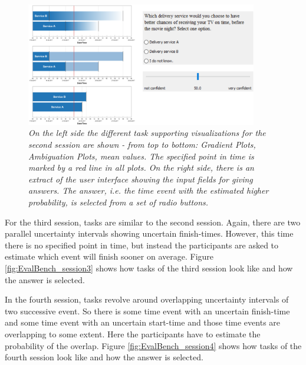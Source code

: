 \begin{figure}[H]
	\centering
	\includegraphics[width=0.9\textwidth]{figures/EvalBench_session2.png}
	\caption{\textit{On the left side the different task supporting visualizations for the second session are shown - from top to bottom: Gradient Plots, Ambiguation Plots, mean values. The specified point in time is marked by a red line in all plots. On the right side, there is an extract of the user interface showing the input fields for giving answers. The answer, i.e. the time event with the estimated higher probability, is selected from a set of radio buttons.}}
	\label{fig:EvalBench_session2}
\end{figure}

For the third session, tasks are similar to the second session. Again, there are two parallel uncertainty intervals showing uncertain finish-times. However, this time there is no specified point in time, but instead the participants are asked to estimate which event will finish sooner on average. Figure \ref{fig:EvalBench_session3} shows how tasks of the third session look like and how the answer is selected. \par \medskip

In the fourth session, tasks revolve around overlapping uncertainty intervals of two successive event. So there is some time event with an uncertain finish-time and some time event with an uncertain start-time and those time events are overlapping to some extent. Here the participants have to estimate the probability of the overlap. Figure \ref{fig:EvalBench_session4} shows how tasks of the fourth session look like and how the answer is selected. \par \medskip

